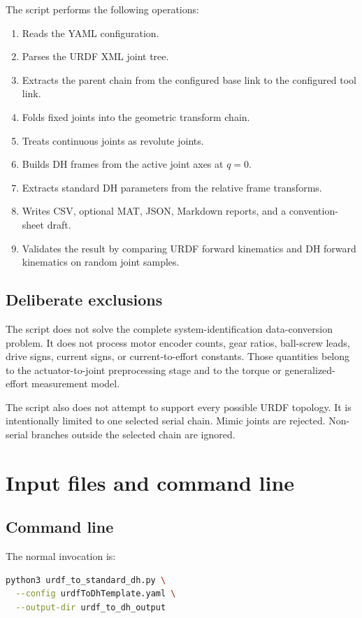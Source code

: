 \documentclass[11pt,a4paper]{article}
\begin{document}
The script performs the following operations:
\begin{enumerate}
  \item Reads the YAML configuration.
  \item Parses the URDF XML joint tree.
  \item Extracts the parent chain from the configured base link to the configured tool link.
  \item Folds fixed joints into the geometric transform chain.
  \item Treats continuous joints as revolute joints.
  \item Builds DH frames from the active joint axes at $q=0$.
  \item Extracts standard DH parameters from the relative frame transforms.
  \item Writes CSV, optional MAT, JSON, Markdown reports, and a convention-sheet draft.
  \item Validates the result by comparing URDF forward kinematics and DH forward kinematics on random joint samples.
\end{enumerate}

\subsection{Deliberate exclusions}

The script does not solve the complete system-identification data-conversion problem. It does not process motor encoder counts, gear ratios, ball-screw leads, drive signs, current signs, or current-to-effort constants. Those quantities belong to the actuator-to-joint preprocessing stage and to the torque or generalized-effort measurement model.

The script also does not attempt to support every possible URDF topology. It is intentionally limited to one selected serial chain. Mimic joints are rejected. Non-serial branches outside the selected chain are ignored.

\section{Input files and command line}

\subsection{Command line}

The normal invocation is:
\begin{lstlisting}[language=bash]
python3 urdf_to_standard_dh.py \
  --config urdfToDhTemplate.yaml \
  --output-dir urdf_to_dh_output
\end{lstlisting}
\end{document}
